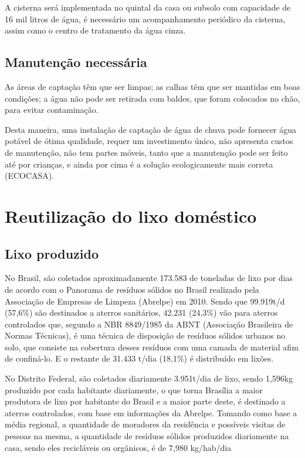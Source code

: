 A cisterna será implementada no quintal da casa ou subsolo com capacidade de 16 mil litros de água, é necessário um acompanhamento periódico da cisterna, assim como o centro de tratamento da água cinza.

\subsection{Manutenção necessária}

	As áreas de captação têm que ser limpas; as calhas têm que ser mantidas em boas condições; a água não pode ser retirada com baldes, que foram colocados no chão, para evitar contaminação.

	Desta maneira, uma instalação de captação de água de chuva pode fornecer água potável de ótima qualidade, requer um investimento único, não apresenta custos de manutenção, não tem partes móveis, tanto que a manutenção pode ser feito até por crianças, e ainda por cima é a solução ecologicamente mais correta (ECOCASA).

\section{Reutilização do lixo doméstico}

\subsection{Lixo produzido}

	No Brasil, são coletados aproximadamente 173.583 de toneladas de lixo por dias de acordo com o Panorama de resíduos sólidos no Brasil realizado pela Associação de Empresas de Limpeza (Abrelpe) em 2010. Sendo que 99.919t/d (57,6\%) são destinados a aterros sanitários, 42.231 (24,3\%) vão para aterros controlados que, segundo a NBR 8849/1985 da ABNT (Associação Brasileira de Normas Técnicas), é uma técnica de disposição de resíduos sólidos urbanos no solo, que consiste na cobertura desses resíduos com uma camada de material afim de confiná-lo. E o restante de 31.433 t/dia (18,1\%) é distribuído em lixões.

	No Distrito Federal, são coletados diariamente 3.951t/dia de lixo, sendo 1,596kg produzido por cada habitante diariamente, o que torna Brasília a maior produtora de lixo por habitante do Brasil e a maior parte deste, é destinado a aterros controlados, com base em informações da Abrelpe. Tomando como base a média regional, a quantidade de moradores da residência e possíveis visitas de pessoas na mesma, a quantidade de resíduos sólidos produzidos diariamente na casa, sendo eles recicláveis ou orgânicos, é de 7,980 kg/hab/dia

